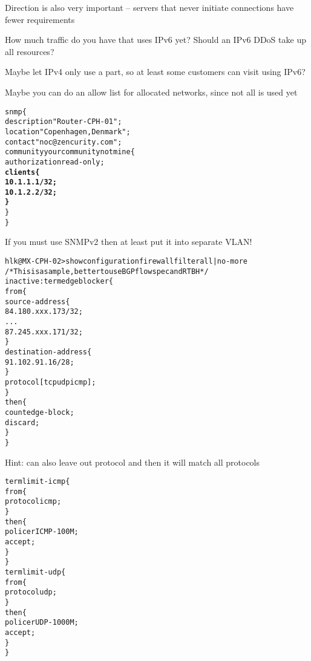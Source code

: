 \documentclass[Screen16to9,17pt]{foils}
\begin{document}
\begin{list2}
\item Direction is also very important -- servers that never initiate connections have fewer requirements
\item How much traffic do you have that uses IPv6 yet? Should an IPv6 DDoS take up all resources?
\item Maybe let IPv4 only use a part, so at least some customers can visit using IPv6?
\item Maybe you can do an allow list for allocated networks, since not all is used yet
\end{list2}




\begin{alltt}\footnotesize
snmp \{
    description "Router-CPH-01";
    location "Copenhagen, Denmark";
    contact "noc@zencurity.com";
    community yourcommunitynotmine \{
        authorization read-only;
        {\bf clients \{
               10.1.1.1/32;
               10.1.2.2/32;
        \}    }
    \}
\}
\end{alltt}

If you must use SNMPv2 then at least put it into separate VLAN! {\myalert}




\begin{alltt}\footnotesize
hlk@MX-CPH-02> show configuration firewall filter all | no-more
/* This is a sample, better to use BGP flowspec and RTBH */
inactive: term edgeblocker \{
    from \{
        source-address \{
            84.180.xxx.173/32;
...
            87.245.xxx.171/32;
        \}
        destination-address \{
            91.102.91.16/28;
        \}
        protocol [ tcp udp icmp ];
    \}
    then \{
        count edge-block;
        discard;
    \}
\}
\end{alltt}
Hint: can also leave out protocol and then it will match all protocols


\begin{alltt}\footnotesize
term limit-icmp \{
    from \{
        protocol icmp;
    \}
    then \{
        policer ICMP-100M;
        accept;
    \}
\}
term limit-udp \{
    from \{
        protocol udp;
    \}
    then \{
        policer UDP-1000M;
        accept;
    \}
\}
\end{alltt}
\end{document}
